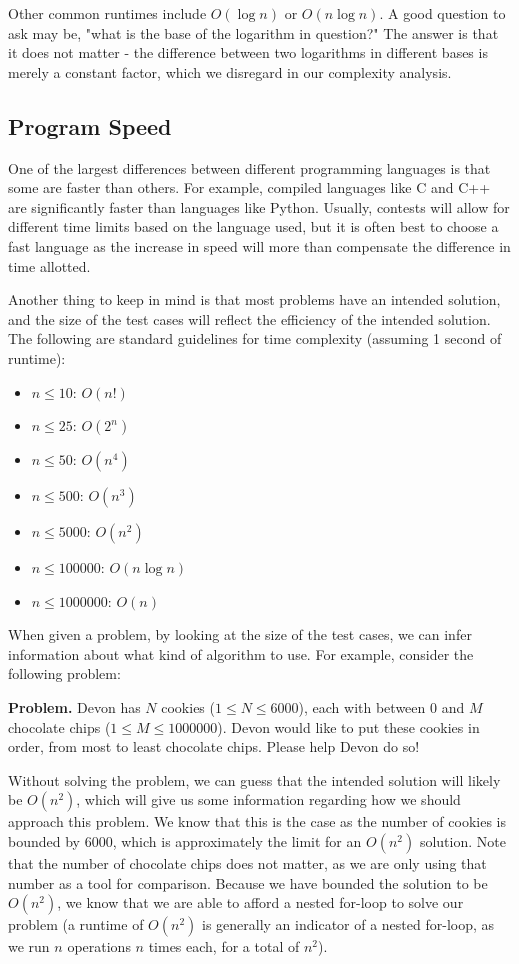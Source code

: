 Other common runtimes include $ O(\log n) $ or $ O(n\log n) $.  A good question to ask may be, "what is the base of the logarithm in question?"  The answer is that it does not matter - the difference between two logarithms in different bases is merely a constant factor, which we disregard in our complexity analysis.

\subsection{Program Speed}

One of the largest differences between different programming languages is that some are faster than others.  For example, compiled languages like C and C++ are significantly faster than languages like Python.  Usually, contests will allow for different time limits based on the language used, but it is often best to choose a fast language as the increase in speed will more than compensate the difference in time allotted.

Another thing to keep in mind is that most problems have an intended solution, and the size of the test cases will reflect the efficiency of the intended solution.  The following are standard guidelines for time complexity (assuming 1 second of runtime):

\begin{itemize}
    \item $ n \leq 10$: $ O(n!) $
    \item $ n \leq 25$: $ O(2^n) $
    \item $ n \leq 50$: $ O(n^4) $
    \item $ n \leq 500$: $ O(n^3) $
    \item $ n \leq 5000$: $ O(n^2) $
    \item $ n \leq 100000$: $ O(n\log n) $
    \item $ n \leq 1000000$: $ O(n) $
\end{itemize}

When given a problem, by looking at the size of the test cases, we can infer information about what kind of algorithm to use.  For example, consider the following problem:

\textbf{Problem.} Devon has $ N $ cookies ($ 1 \leq N \leq 6000 $), each with between $ 0 $ and $ M $ chocolate chips ($ 1 \leq M \leq 1000000 $).  Devon would like to put these cookies in order, from most to least chocolate chips.  Please help Devon do so!

Without solving the problem, we can guess that the intended solution will likely be $ O(n^2) $, which will give us some information regarding how we should approach this problem.  We know that this is the case as the number of cookies is bounded by $ 6000 $, which is approximately the limit for an $ O(n^2) $ solution.  Note that the number of chocolate chips does not matter, as we are only using that number as a tool for comparison.  Because we have bounded the solution to be $ O(n^2) $, we know that we are able to afford a nested for-loop to solve our problem (a runtime of $ O(n^2) $ is generally an indicator of a nested for-loop, as we run $ n $ operations $ n $ times each, for a total of $ n^2 $).

